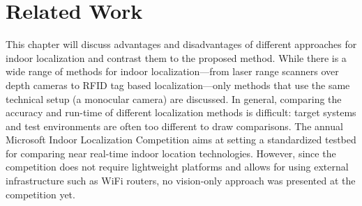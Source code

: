 \chapter{Related Work}
\label{chap:relatedwork}

This chapter will discuss advantages and disadvantages of different approaches for indoor localization and
contrast them to the proposed method. While there is a wide range of methods for indoor localization---from laser range scanners over depth cameras to RFID tag based localization---only methods that use the same technical setup (a monocular camera) are discussed. In general, comparing the accuracy and run-time of different localization methods is difficult: target systems and test environments are often too different to draw comparisons. The annual Microsoft Indoor Localization Competition aims at setting a standardized testbed for comparing near real-time indoor location technologies. However, since the competition does not require lightweight platforms and allows for using external infrastructure such as WiFi routers, no vision-only approach was presented at the competition yet.